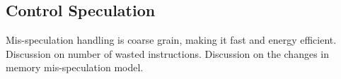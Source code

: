 \subsection{Control Speculation}
\label{sec:speculation}

Mis-speculation handling is coarse grain, making it fast and energy efficient.
Discussion on number of wasted instructions.
Discussion on the changes in memory mis-speculation model.

%
%
